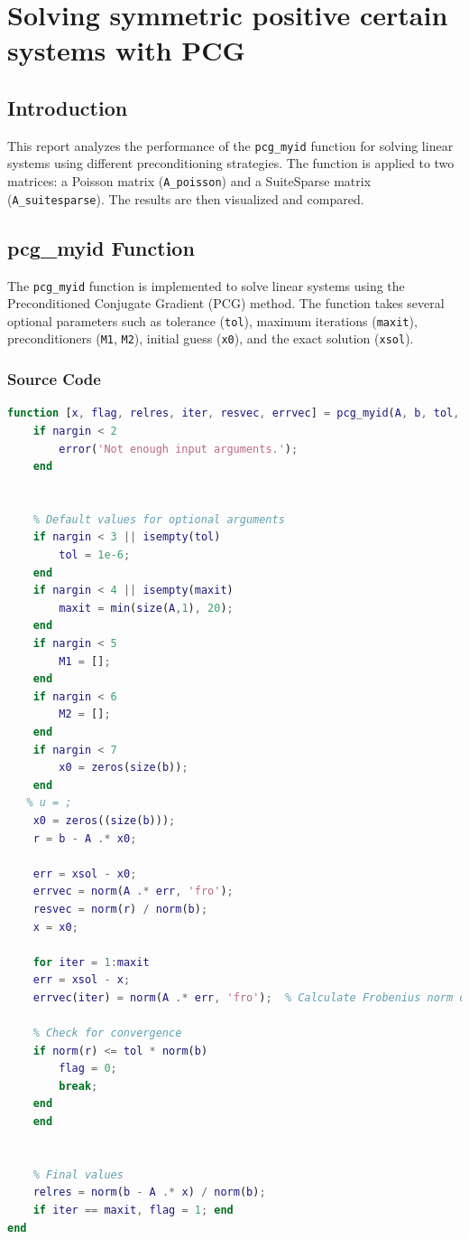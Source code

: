 \chapter{Solving symmetric positive certain
systems with PCG}
\section*{Introduction}
This report analyzes the performance of the \texttt{pcg\_myid} function for solving linear systems using different preconditioning strategies. The function is applied to two matrices: a Poisson matrix (\texttt{A\_poisson}) and a SuiteSparse matrix (\texttt{A\_suitesparse}). The results are then visualized and compared.

\section*{pcg\_myid Function}

The \texttt{pcg\_myid} function is implemented to solve linear systems using the Preconditioned Conjugate Gradient (PCG) method. The function takes several optional parameters such as tolerance (\texttt{tol}), maximum iterations (\texttt{maxit}), preconditioners (\texttt{M1}, \texttt{M2}), initial guess (\texttt{x0}), and the exact solution (\texttt{xsol}). 

\subsection*{Source Code}
\begin{center}
    \begin{lstlisting}[language=MATLAB, caption=Time Analysis Source Code]
        function [x, flag, relres, iter, resvec, errvec] = pcg_myid(A, b, tol, maxit,M1,M2,x0, xsol, varargin)
    if nargin < 2
        error('Not enough input arguments.');
    end


    % Default values for optional arguments
    if nargin < 3 || isempty(tol)
        tol = 1e-6; 
    end
    if nargin < 4 || isempty(maxit)
        maxit = min(size(A,1), 20); 
    end
    if nargin < 5
        M1 = []; 
    end
    if nargin < 6
        M2 = []; 
    end
    if nargin < 7
        x0 = zeros(size(b)); 
    end
   % u = ;
    x0 = zeros((size(b)));
    r = b - A .* x0;

    err = xsol - x0;
    errvec = norm(A .* err, 'fro');
    resvec = norm(r) / norm(b);
    x = x0;

    for iter = 1:maxit
    err = xsol - x;
    errvec(iter) = norm(A .* err, 'fro');  % Calculate Frobenius norm of A * err

    % Check for convergence
    if norm(r) <= tol * norm(b)
        flag = 0;
        break;
    end
    end


    % Final values
    relres = norm(b - A .* x) / norm(b);
    if iter == maxit, flag = 1; end
end

    \end{lstlisting}
\end{center}
